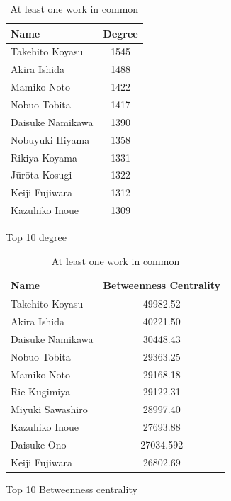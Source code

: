 \begin{table}[!htb]
    \begin{minipage}{.5\textwidth}
        \centering
            \begin{tabular}{|l|c|}
				\hline
				Name & Degree \\ 
				\hline
				Takehito Koyasu & 1545 \\ 
				\hline
				Akira Ishida & 1488 \\ 
				\hline
				Mamiko Noto & 1422 \\ 
				\hline
				Nobuo Tobita & 1417 \\ 
				\hline
				Daisuke Namikawa & 1390 \\ 
				\hline
				Nobuyuki Hiyama & 1358 \\ 
				\hline
				Rikiya Koyama & 1331 \\ 
				\hline
				Jūrōta Kosugi & 1322 \\ 
				\hline
				Keiji Fujiwara & 1312 \\ 
				\hline
				Kazuhiko Inoue & 1309 \\ 
				\hline
			\end{tabular}
            \caption{Top 10 degree}
    \end{minipage}%
    \begin{minipage}{.6\textwidth}
        \centering
        \begin{tabular}{|l|c|}
				\hline
				Name & Betweenness Centrality \\
				\hline
				Takehito Koyasu & 49982.52 \\
				\hline
				Akira Ishida & 40221.50 \\
				\hline
				Daisuke Namikawa & 30448.43 \\
				\hline
				Nobuo Tobita & 29363.25 \\
				\hline
				Mamiko Noto & 29168.18 \\
				\hline
				Rie Kugimiya & 29122.31 \\
				\hline
				Miyuki Sawashiro & 28997.40 \\
				\hline
				Kazuhiko Inoue & 27693.88 \\
				\hline
				Daisuke Ono & 27034.592 \\
				\hline
				Keiji Fujiwara & 26802.69 \\
				\hline
		\end{tabular}
        \caption{Top 10 Betweenness centrality }
    \end{minipage}
    \caption{At least one work in common}
    \label{tab:top10atLeast1Work}
\end{table}

